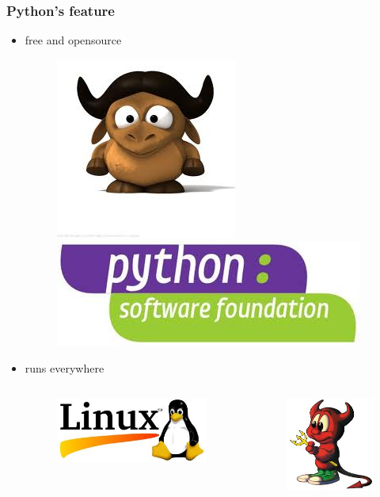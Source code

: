 \documentclass[compress=true]{beamer}
\begin{document}
\begin{frame}
	\frametitle{Python's feature}
	\begin{itemize}
		\item free and opensource
			\begin{figure}
				\includegraphics[height=0.2\textheight]{gnu.png}
				\includegraphics[height=0.2\textheight]{psf.png}
			\end{figure}
		\item runs everywhere\\
			\begin{columns}
				\begin{column}{0.333\textwidth}
					\begin{figure}
						\includegraphics[height=0.2\textheight]{linux.png}
					\end{figure}
				\end{column}
				\begin{column}{0.333\textwidth}
					\begin{figure}
						\includegraphics[height=0.2\textheight]{bsd.png}

\end{figure}
\end{column}
\end{columns}
\end{itemize}
\end{frame}
\end{document}
